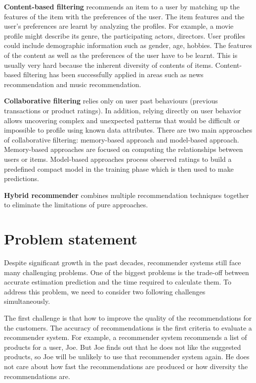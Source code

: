 \documentclass[oneside,13pt]{extreport}
\begin{document}
\begin{description}
    \item{\textbf{Content-based filtering}} recommends an item to a user by matching up the features of the item with the preferences of the user. The item features and the user's preferences are learnt by analyzing the profiles. For example, a movie profile might describe its genre, the participating actors, directors. User profiles could include demographic information such as gender, age, hobbies. The features of the content as well as the preferences of the user have to be learnt. This is usually very hard because the inherent diversity of contents of items. Content-based filtering has been successfully applied in areas such as news recommendation and music recommendation.
    \item{\textbf{Collaborative filtering}} relies only on user past behaviours (previous transactions or product ratings). In addition, relying directly on user behavior allows uncovering complex and unexpected patterns that would be difficult or impossible to profile using known data attributes\cite{BellKorFactor}. There are two main approaches of collaborative filtering: memory-based approach and model-based approach. Memory-based approaches are focused on computing the relationships between users or items. Model-based approaches process observed ratings to build a predefined compact model in the training phase which is then used to make predictions.
    \item{\textbf{Hybrid recommender}} combines multiple recommendation techniques together to eliminate the limitations of pure approaches\cite{TranHybrib}.
\end{description}


\section{Problem statement}
Despite significant growth in the past decades, recommender systems still face many challenging problems. One of the biggest problems is the trade-off between accurate estimation prediction and the time required to calculate them.  To address this problem, we need to consider two following challenges simultaneously.

The first challenge is that how to improve the quality of the recommendations for the customers. The accuracy of recommendations is the first criteria to evaluate a recommender system. For example, a recommender system recommends a list of products for a user, Joe. But Joe finds out that he does not like the suggested products, so Joe will be unlikely to use that recommender system again. He does not care about how fast the recommendations are produced or how diversity the recommendations are.
\end{document}
